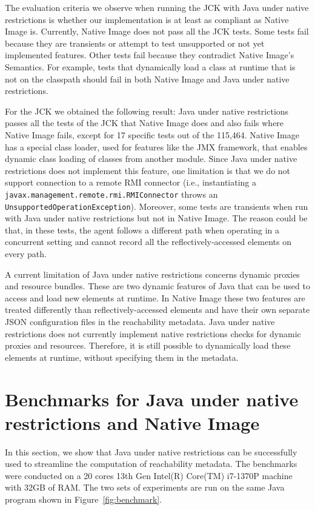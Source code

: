 The evaluation criteria we observe when running the JCK with Java under native restrictions is whether our implementation is at least as compliant as Native Image is. Currently, Native Image does not pass all the JCK tests. Some tests fail because they are transients or attempt to test unsupported or not yet implemented features. Other tests fail because they contradict Native Image's Semantics. For example, tests that dynamically load a class at runtime that is not on the classpath should fail in both Native Image and Java under native restrictions. 

For the JCK we obtained the following result: Java under native restrictions passes all the tests of the JCK that Native Image does and also fails where Native Image fails, except for 17 specific tests out of the 115,464. Native Image has a special class loader, used for features like the JMX framework, that enables dynamic class loading of classes from another module. Since Java under native restrictions does not implement this feature, one limitation is that we do not support connection to a remote RMI connector (i.e., instantiating a \verb|javax.management.remote.rmi.RMIConnector| throws an \verb|UnsupportedOperationException|). 
Moreover, some tests are transients when run with Java under native restrictions but not in Native Image. The reason could be that, in these tests, the agent follows a different path when operating in a concurrent setting and cannot record all the reflectively-accessed elements on every path. 

A current limitation of Java under native restrictions concerns dynamic proxies and resource bundles. These are two dynamic features of Java that can be used to access and load new elements at runtime. In Native Image these two features are treated differently than reflectively-accessed elements and have their own separate JSON configuration files in the reachability metadata. Java under native restrictions does not currently implement native restrictions checks for dynamic proxies and resources. Therefore, it is still possible to dynamically load these elements at runtime, without specifying them in the metadata. 

\section{Benchmarks for Java under native restrictions and Native Image}\label{benchmark}
In this section, we show that Java under native restrictions can be successfully used to streamline the computation of reachability metadata. The benchmarks were conducted on a 20 cores 13th Gen Intel(R) Core(TM) i7-1370P machine with 32GB of RAM. The two sets of experiments are run on the same Java program shown in Figure~\ref{fig:benchmark}. 

